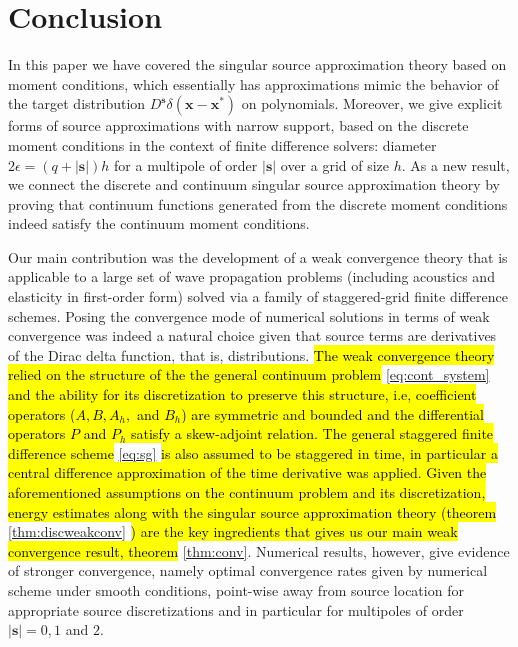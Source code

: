 \section{Conclusion}

In this paper we have covered the singular source approximation theory
based on moment conditions, which essentially has approximations mimic 
the behavior of the target distribution $D^{\mathbf s}\delta(\mathbf x-\mathbf x^*)$ on polynomials.
Moreover, we give explicit forms of source approximations with narrow support,
based on the discrete moment conditions in the context of finite difference solvers:
diameter $2\epsilon = (q+|\mathbf s|) h$ for a multipole of order $|\mathbf s|$
over a grid of size $h$.
As a new result, we connect the discrete and continuum singular source approximation
theory by proving that continuum functions generated from the discrete moment conditions 
indeed satisfy the continuum moment conditions.

Our main contribution was the development of a weak convergence theory that is applicable to a large set of wave propagation problems (including acoustics and elasticity in first-order form) solved via a family of staggered-grid finite difference schemes.%
Posing the convergence mode of numerical solutions in terms of weak convergence was indeed a natural choice given that source terms are derivatives of the Dirac delta function, that is, distributions.
\hl{
The weak convergence theory relied on the structure of the the general continuum problem} \ref{eq:cont_system} \hl{and the ability for its discretization to preserve this structure, i.e, coefficient operators ($A,B,A_h,$ and $B_h$) are symmetric and bounded and the differential operators $P$ and $P_h$ satisfy a skew-adjoint relation.
The general staggered finite difference scheme} \ref{eq:sg} \hl{is also assumed to be staggered in time, in particular a central difference approximation of the time derivative was applied.
Given the aforementioned assumptions on the continuum problem and its discretization, energy estimates along with the singular source approximation theory (theorem }\ref{thm:discweakconv} \hl{) are the key ingredients that gives us our main weak convergence result, theorem} \ref{thm:conv}.
Numerical results, however, give evidence of stronger convergence, namely 
optimal convergence rates given by numerical scheme under smooth conditions,
point-wise away from source location for appropriate source discretizations and
in particular for multipoles of order $|\mathbf s |=0,1$ and $2$.






